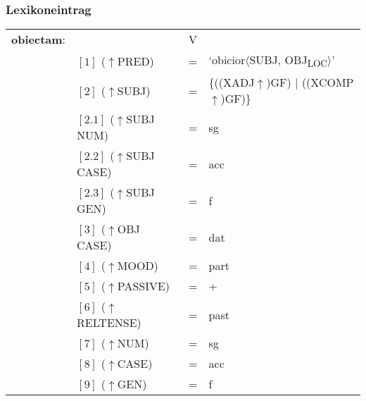 \documentclass[12pt,a4paper]{article}
\begin{document}
\subsubsection{Lexikoneintrag}
\begin{singlespace}
\begin{tabular}{ l  l  l  l  } 
\textbf{obiectam}: &  & V \\
$\qquad$ & $[1]$ \:  ($\uparrow$PRED) & = & `obicior$\langle$SUBJ, OBJ\textsubscript{LOC}$\rangle$'\\
$\qquad$ & $[2]$ \:  ($\uparrow$SUBJ) & = & \{((XADJ$\uparrow$)GF) $\mid$ ((XCOMP$\uparrow$)GF)\} \\
$\qquad$ & $[2.1]$ \:  ($\uparrow$SUBJ NUM) & = & sg \\
$\qquad$ & $[2.2]$ \: ($\uparrow$SUBJ CASE) & = & acc \\
$\qquad$ & $[2.3]$ \: ($\uparrow$SUBJ GEN) & = & f \\
$\qquad$ & $[3]$ \: ($\uparrow$OBJ CASE) & = & dat \\
$\qquad$ & $[4]$ \:  ($\uparrow$MOOD) & = & part\\
$\qquad$ & $[5]$ \:  ($\uparrow$PASSIVE) & = & + \\
$\qquad$ & $[6]$ \:  ($\uparrow$RELTENSE) & = & past \\
$\qquad$ & $[7]$ \:  ($\uparrow$NUM) & = & sg \\
$\qquad$ & $[8]$ \: ($\uparrow$CASE) & = & acc \\
$\qquad$ & $[9]$ \: ($\uparrow$GEN) & = & f \\
\end{tabular}
\newline
\newline
\end{singlespace}
\end{document}
